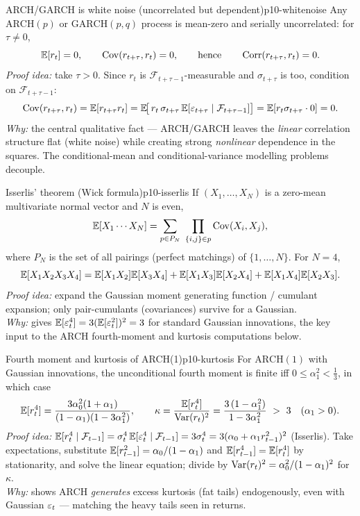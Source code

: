\begin{proposition}{ARCH/GARCH is white noise (uncorrelated but dependent)}{p10-whitenoise}
Any $\mathrm{ARCH}(p)$ or $\mathrm{GARCH}(p,q)$ process is mean-zero and serially
uncorrelated: for $\tau\ne0$,
\[
\mathbb{E}[r_t]=0,\qquad \operatorname{Cov}(r_{t+\tau},r_t)=0,\qquad\text{hence}\qquad \operatorname{Corr}(r_{t+\tau},r_t)=0 .
\]
\textit{Proof idea:} take $\tau>0$. Since $r_t$ is
$\mathcal F_{t+\tau-1}$-measurable and $\sigma_{t+\tau}$ is too, condition on
$\mathcal F_{t+\tau-1}$:
\[
\operatorname{Cov}(r_{t+\tau},r_t)=\mathbb{E}[r_{t+\tau}r_t]
=\mathbb{E}\!\big[\,r_t\,\sigma_{t+\tau}\,\mathbb{E}[\varepsilon_{t+\tau}\mid\mathcal F_{t+\tau-1}]\big]
=\mathbb{E}[r_t\sigma_{t+\tau}\cdot 0]=0 .
\]
\textit{Why:} the central qualitative fact --- ARCH/GARCH leaves the
\emph{linear} correlation structure flat (white noise) while creating strong
\emph{nonlinear} dependence in the squares. The conditional-mean and
conditional-variance modelling problems decouple.
\end{proposition}

\begin{theorem}{Isserlis' theorem (Wick formula)}{p10-isserlis}
If $(X_1,\dots,X_N)$ is a zero-mean multivariate normal vector and $N$ is even,
\[
\E[X_1\cdots X_N]=\sum_{p\in P_N}\ \prod_{\{i,j\}\in p}\Cov(X_i,X_j),
\]
where $P_N$ is the set of all pairings (perfect matchings) of $\{1,\dots,N\}$.
For $N=4$,
\[
\mathbb{E}[X_1X_2X_3X_4]=\mathbb{E}[X_1X_2]\mathbb{E}[X_3X_4]+\mathbb{E}[X_1X_3]\mathbb{E}[X_2X_4]+\mathbb{E}[X_1X_4]\mathbb{E}[X_2X_3].
\]
\textit{Proof idea:} expand the Gaussian moment generating function / cumulant
expansion; only pair-cumulants (covariances) survive for a Gaussian.\\
\textit{Why:} gives $\mathbb{E}[\varepsilon_t^4]=3(\mathbb{E}[\varepsilon_t^2])^2=3$ for standard Gaussian
innovations, the key input to the ARCH fourth-moment and kurtosis computations
below.
\end{theorem}

\begin{proposition}{Fourth moment and kurtosis of ARCH(1)}{p10-kurtosis}
For $\mathrm{ARCH}(1)$ with Gaussian innovations, the unconditional fourth moment
is finite iff $0\le\alpha_1^2<\tfrac13$, in which case
\[
\E[r_t^4]=\frac{3\alpha_0^2(1+\alpha_1)}{(1-\alpha_1)(1-3\alpha_1^2)},
\qquad
\kappa=\frac{\E[r_t^4]}{\Var(r_t)^2}=\frac{3\,(1-\alpha_1^2)}{1-3\alpha_1^2}\ >\ 3
\quad(\alpha_1>0).
\]
\textit{Proof idea:} $\mathbb{E}[r_t^4\mid\mathcal F_{t-1}]
=\sigma_t^4\,\mathbb{E}[\varepsilon_t^4\mid\mathcal F_{t-1}]=3\sigma_t^4=3(\alpha_0+\alpha_1 r_{t-1}^2)^2$
(Isserlis). Take expectations, substitute $\mathbb{E}[r_{t-1}^2]=\alpha_0/(1-\alpha_1)$
and $\mathbb{E}[r_{t-1}^4]=\mathbb{E}[r_t^4]$ by stationarity, and solve the linear equation;
divide by $\operatorname{Var}(r_t)^2=\alpha_0^2/(1-\alpha_1)^2$ for $\kappa$.\\
\textit{Why:} shows ARCH \emph{generates} excess kurtosis (fat tails) endogenously,
even with Gaussian $\varepsilon_t$ --- matching the heavy tails seen in returns.
\end{proposition}

